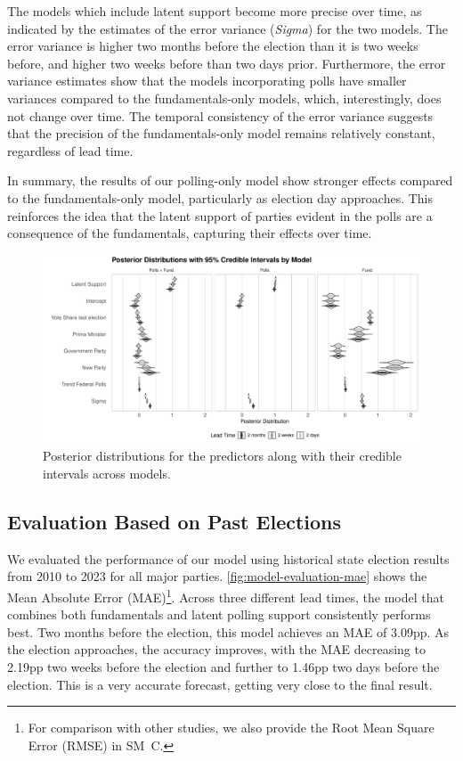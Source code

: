 \documentclass[12pt]{article}
\begin{document}
\begin{doublespacing}
The models which include latent support become more precise over time, as indicated by the estimates of the error variance (\textit{Sigma}) for the two models. The error variance is higher two months before the election than it is two weeks before, and higher two weeks before than two days prior. Furthermore, the error variance estimates show that the models incorporating polls have smaller variances compared to the fundamentals-only models, which, interestingly, does not change over time. The temporal consistency of the error variance suggests that the precision of the fundamentals-only model remains relatively constant, regardless of lead time.

In summary, the results of our polling-only model show stronger effects compared to the fundamentals-only model, particularly as election day approaches. This reinforces the idea that the latent support of parties evident in the polls are a consequence of the fundamentals, capturing their effects over time.


\begin{figure}[!t]
    \centering
    \includegraphics[width=\textwidth]{fg3_fig_eval_bayes_par.pdf}  
    \caption{Posterior distributions for the predictors along with their credible intervals across models.}
    \label{fig:fundamental-estimates}
\end{figure}

\FloatBarrier
\subsection{Evaluation Based on Past Elections}
\FloatBarrier


We evaluated the performance of our model using historical state election results from 2010 to 2023 for all major parties. \autoref{fig:model-evaluation-mae} shows the Mean Absolute Error (MAE)\footnote{For comparison with other studies, we also provide the Root Mean Square Error (RMSE) in SM~C.}. Across three different lead times, the model that combines both fundamentals and latent polling support consistently performs best. Two months before the election, this model achieves an MAE of 3.09pp. As the election approaches, the accuracy improves, with the MAE decreasing to 2.19pp two weeks before the election and further to 1.46pp two days before the election. This is a very accurate forecast, getting very close to the final result.


\end{doublespacing}
\end{document}
